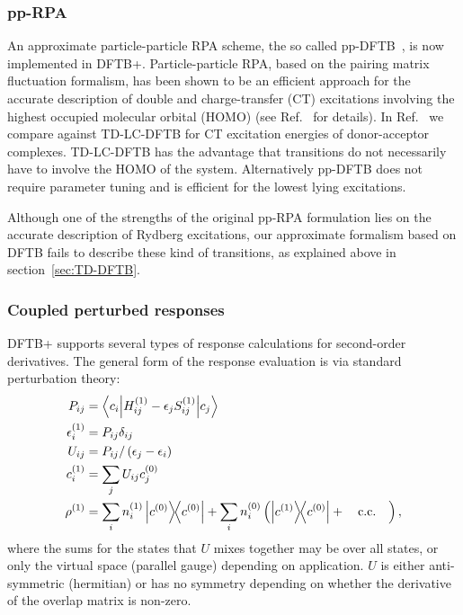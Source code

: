 \documentclass[reprint,onecolumn,superscriptaddress]{revtex4-1}
\newcommand{\dftbp}{DFTB+}
\begin{document}
\subsubsection{pp-RPA}

An approximate particle-particle RPA scheme, the so called
pp-DFTB~\cite{Kranz2017}, is now implemented in DFTB+. Particle-particle RPA,
based on the pairing matrix fluctuation formalism, has been shown to be an
efficient approach for the accurate description of double and charge-transfer
(CT) excitations involving the highest occupied molecular orbital (HOMO) (see
Ref.~\cite{Yang2017} for details).  In Ref.~\cite{Kranz2017} we
compare against TD-LC-DFTB for CT excitation energies of donor-acceptor
complexes. TD-LC-DFTB has the advantage that transitions do not necessarily have
to involve the HOMO of the system. Alternatively pp-DFTB does not require
parameter tuning and is efficient for the lowest lying excitations.

Although one of the strengths of the original pp-RPA formulation lies on the
accurate description of Rydberg excitations, our approximate formalism based on
DFTB fails to describe these kind of transitions, as explained above in
section~\ref{sec:TD-DFTB}.

\subsubsection{Coupled perturbed responses}

\dftbp{} supports several types of response calculations for second-order
derivatives. The general form of the response evaluation is via standard
perturbation theory:
\begin{align}
  P_{ij} &= \mel**{c_i}{H^{(1)}_{ij} - \epsilon_j S^{(1)}_{ij}}{c_j}\\
  \epsilon_i^{(1)} &= P_{ij} \delta_{ij}\\
  U_{ij} &= P_{ij} / \left( \epsilon_j - \epsilon_i \right)\\
  c_i^{(1)} &= \sum_j U_{ij} c_j^{(0)}\\
  \rho^{(1)} &= \sum_i n^{(1)}_i \dyad{c^{(0)}} + \sum_i n^{(0)}_i \left(
               \dyad{c^{(1)}}{c^{(0)}} + \qcc\right),
\end{align}
where the sums for the states that $U$ mixes together may be over all states, or only
the virtual space (parallel gauge) depending on application. $U$ is either
anti-symmetric (hermitian) or has no symmetry depending on whether the derivative
of the overlap matrix is non-zero.
\end{document}
